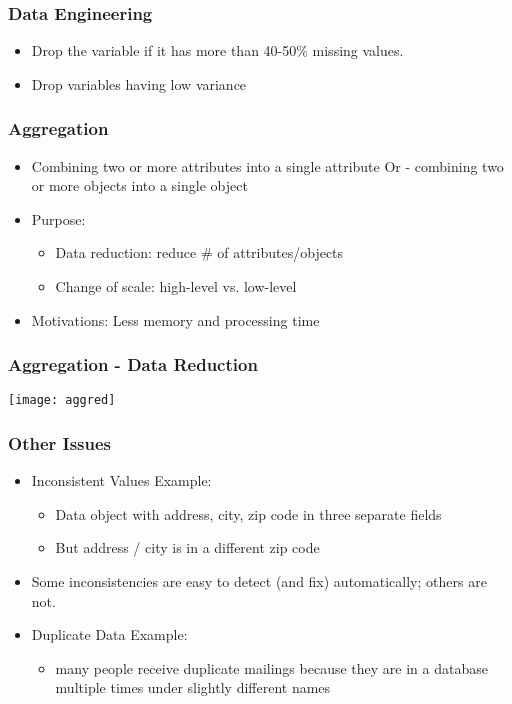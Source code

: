 \begin{frame}[fragile]\frametitle{Data Engineering}
	\begin{itemize}
	\item Drop the variable if it has more than 40-50\% missing values.
	\item Drop variables having low variance
	\end{itemize}
\end{frame}




\begin{frame}[fragile]\frametitle{Aggregation}	
\begin{itemize}
\item Combining two or more attributes into a single attribute Or - combining two or more objects into a single object
\item Purpose:
	\begin{itemize}
	\item Data reduction: reduce \# of attributes/objects
	\item Change of scale: high-level vs. low-level
	\end{itemize}
\item Motivations: Less memory and processing time

\end{itemize}
\end{frame}

\begin{frame}[fragile] \frametitle{Aggregation - Data Reduction}
\begin{center}
\texttt{[image: aggred]}
\end{center}
\end{frame}


\begin{frame}[fragile] \frametitle{Other Issues}
\begin{itemize}
\item Inconsistent Values Example:
	\begin{itemize}
	\item Data object with address, city, zip code in three separate fields
	\item But address / city is in a different zip code
	\end{itemize}
\item Some inconsistencies are easy to detect (and fix) automatically; others are not.
\item Duplicate Data Example:
	\begin{itemize}
	\item many people receive duplicate mailings because they are in a database multiple times under slightly different names
	\end{itemize}
\end{itemize}
\end{frame}


